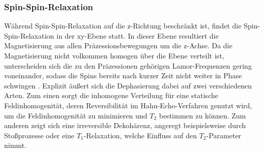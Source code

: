 \subsubsection{Spin-Spin-Relaxation}
\noindent Während Spin-Spin-Relaxation auf die z-Richtung beschränkt ist, findet
die Spin-Spin-Relaxation in der xy-Ebene statt. In dieser Ebene resultiert die
Magnetisierung aus allen Präzessionsbewegungen um die z-Achse. Da die Magnetisierung nicht
volkommen homogen über die Ebene verteilt ist, unterscheiden sich die zu den
Präzessionen gehörigen Lamor-Frequenzen gering voneinander, sodass die
Spins bereits nach kurzer Zeit nicht weiter in Phase schwingen \cite{nmr}.
Explizit äußert sich die Dephasierung dabei auf zwei verschiedenen Arten. Zum
einen sorgt die inhomogene Verteilung für eine statische Feldinhomogenität, deren
Reversibilität im Hahn-Echo-Verfahren genutzt wird, um die Feldinhomogenität zu
minimieren und $T_2$ bestimmen zu können. Zum anderen zeigt sich eine irreversible
Dekohärenz, angeregt beispielsweise durch Stoßprozesse oder eine $T_1$-Relaxation,
welche Einfluss auf den $T_2$-Parameter nimmt.
